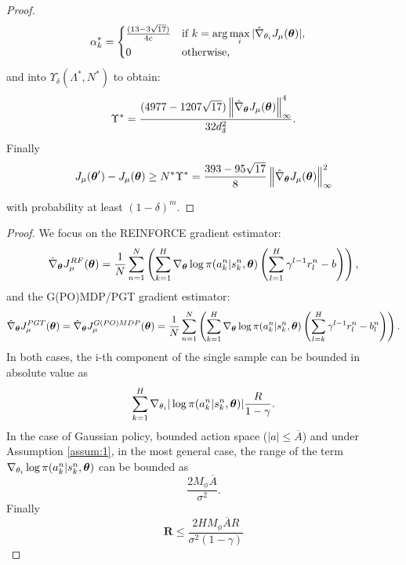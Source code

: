 \begin{proof}
\begin{align*}
&\alpha_k^* = 
\begin{cases}  
	\frac{(13-3\sqrt{17})}
		{4c} & 
		\text{if } k = \arg\max\limits_i |\gradApp{\theta_i}|,	\\
		0 & \text{otherwise},
\end{cases}
\end{align*}
and into $\Upsilon_{\delta}(\Lambda^*,N^*)$ to obtain:
\[
	\Upsilon^* = \frac{(4977-1207\sqrt{17})\norm[\infty]{\gradApp{\vtheta}}^4}{32d_{\delta}^2}.
\]
Finally
\[
	\DeltaJ \geq N^*\Upsilon^* 
	= \frac{393-95\sqrt{17}}{8}\norm[\infty]{\gradApp{\vtheta}}^2
\]

with probability at least $(1-\delta)^m$.

\end{proof}


\secondlemma*
\begin{proof}
We focus on the REINFORCE\cite{Williams1992} gradient estimator:
\[
\hat{\nabla}_{\vtheta}J_{\mu}^{RF}(\vtheta) = 
	\frac{1}{N}\sum\limits_{n=1}^N\left(
	\sum\limits_{k=1}^H\nabla_{\vtheta}\log\pi(a_k^n|s_k^n,\vtheta)
	\left(\sum\limits_{l=1}^H\gamma^{l-1}r_l^n-b\right)\right),
\]
and the G(PO)MDP\cite{bb-ihgbps-01}/PGT\cite{Sutton1999a} gradient estimator:
\[
\gradPGT{\vtheta} = \gradGPOMDP{\vtheta} = 
	\frac{1}{N}\sum\limits_{n=1}^N\left(
	\sum\limits_{k=1}^H\nabla_{\vtheta}\log\pi(a_k^n|s_k^n,\vtheta)
	\left(\sum\limits_{l=k}^H\gamma^{l-1}r_l^n-b_l^n\right)\right).
\]
In both cases, the i-th component of the single sample can be bounded in absolute value as
\[
\sum\limits_{k=1}^H\nabla_{\theta_i}|\log\pi(a_k^n|s_k^n,\vtheta)|\frac{R}{1-\gamma}.
\]
In the case of Gaussian policy, bounded action space ($|a| \leq \overline{A}$) and under Assumption \ref{assum:1}, in the most general case, the range of the term $\nabla_{\theta_i}\log\pi(a_k^n|s_k^n,\vtheta)$ can be bounded as
\[
\frac{2M_{\phi}\overline{A}}{\sigma^2}.
\] 
Finally
\[
\mathbf{R} \leq \frac{2HM_{\phi}\overline{A}R}{\sigma^2(1-\gamma)}
\]
\end{proof}